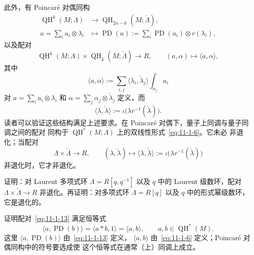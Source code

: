 \begin{remark}
此外，有 Poincaré 对偶同构
\[
\begin{aligned}
  \operatorname{QH}^k(M;\Lambda)&\longrightarrow
  \operatorname{QH}_{2n-k}(M;\check\Lambda),\\
  a=\sum_i a_i\otimes\lambda_i&\longmapsto
  \operatorname{PD}(a):=\sum_i\operatorname{PD}(a_i)\otimes r(\lambda_i),
\end{aligned}
\]
以及配对
\[
  \operatorname{QH}^k(M;\Lambda)\times
  \operatorname{QH}_k(M;\check\Lambda)\longrightarrow R,
  \qquad(a,\alpha)\longmapsto\langle a,\alpha\rangle,
\]
其中
\begin{equation}\label{eq:11-1-13}
  \langle a,\alpha\rangle
  :=\sum_{i,j}\langle\lambda_i,\check\lambda_j\rangle
  \int_{\alpha_j}a_i
\end{equation}
对 $a=\sum_i a_i\otimes\lambda_i$ 和
$\alpha=\sum_j\alpha_j\otimes\check\lambda_j$ 定义，而
\[
  \langle\lambda,\check\lambda\rangle
  :=\iota\bigl(\lambda r^{-1}(\check\lambda)\bigr).
\]
读者可以验证这些结构满足上述要求。在 Poincaré 对偶下，量子上同调与量子同调之间的配对
同构于 $\operatorname{QH}^*(M;\Lambda)$ 上的双线性形式~\eqref{eq:11-1-6}。它未必
非退化；当配对
\[
  \Lambda\times\check\Lambda\longrightarrow R,\qquad
  (\lambda,\check\lambda)\longmapsto
  \langle\lambda,\check\lambda\rangle
  :=\iota\bigl(\lambda r^{-1}(\check\lambda)\bigr)
\]
非退化时，它才非退化。
\end{remark}

\begin{exercise}\label{ex:11-1-21}
证明：对 Laurent 多项式环 $\Lambda=R[q,q^{-1}]$ 以及 $q$ 中的 Laurent 级数环，配对
$\Lambda\times\check\Lambda\to R$ 非退化。再证明：对多项式环 $\Lambda=R[q]$ 以及
$q$ 中的形式幂级数环，它是退化的。
\end{exercise}

\begin{exercise}\label{ex:11-1-22}
证明配对~\eqref{eq:11-1-13} 满足恒等式
\[
  \langle a,\operatorname{PD}(b)\rangle
  =\langle a*b,1\rangle
  =\langle a,b\rangle,
  \qquad a,b\in\operatorname{QH}^*(M).
\]
这里 $\langle a,\operatorname{PD}(b)\rangle$ 由~\eqref{eq:11-1-13} 定义，
$\langle a,b\rangle$ 由~\eqref{eq:11-1-6} 定义；Poincaré 对偶同构中的符号要选成使
这个恒等式在通常（上）同调上成立。
\end{exercise}
